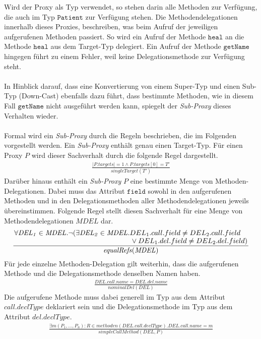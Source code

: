 \documentclass[a4paper,12pt]{article}
\begin{document}
Wird der Proxy als Typ verwendet, so stehen darin alle Methoden zur Verfügung, die auch im Typ $\texttt{Patient}$ zur Verfügung stehen. Die Methodendelegationen innerhalb dieses Proxies, beschreiben, was beim Aufruf der jeweiligen aufgerufenen Methoden passiert. So wird ein Aufruf der Methode $\texttt{heal}$ an die Methode $\texttt{heal}$ aus dem Target-Typ delegiert. Ein Aufruf der Methode $\texttt{getName}$ hingegen führt zu einem Fehler, weil keine Delegationsmethode zur Verfügung steht.\\\\
In Hinblick darauf, dass eine Konvertierung von einem Super-Typ und einen Sub-Typ (Down-Cast) ebenfalls dazu führt, dass bestimmte Methoden, wie in diesem Fall $\texttt{getName}$ nicht ausgeführt werden kann, spiegelt der \emph{Sub-Proxy} dieses Verhalten wieder.\\\\
Formal wird ein \emph{Sub-Proxy} durch die Regeln beschrieben, die im Folgenden vorgestellt werden.
Ein \emph{Sub-Proxy} enthält genau einen Target-Typ. Für einen Proxy $P$ wird dieser Sachverhalt durch die folgende Regel dargestellt.
\begin{gather*}
\frac{|P.targets| = 1 \wedge P.targets[0] = T'}{\mathit{singleTarget(T')}}
\end{gather*}
Darüber hinaus enthält ein \emph{Sub-Proxy} $P$ eine bestimmte Menge von Methoden-Delegationen. Dabei muss das Attribut $\texttt{field}$ sowohl in den aufgerufenen Methoden und in den Delegationsmethoden aller Methodendelegationen jeweils übereinstimmen. Folgende Regel stellt diesen Sachverhalt für eine Menge von Methodendelegationen $\mathit{MDEL}$ dar.
\begin{gather*}
\frac{\splitfrac{\forall \mathit{DEL_1}\in \mathit{MDEL}. \neg(\exists \mathit{DEL_2} \in \mathit{MDEL}.DEL_1.call.field \neq DEL_2.call.field}{ \vee DEL_1.del.field \neq DEL_2.del.field )}}
{\mathit{equalRefs(MDEL)}}
\end{gather*}
Für jede einzelne Methoden-Delegation gilt weiterhin, dass die aufgerufenen Methode und die Delegationsmethode denselben Namen haben.
\begin{gather*}
\frac{\mathit{DEL.call.name} = \mathit{DEL.del.name}}
{\mathit{nominalDel(DEL)}}
\end{gather*}
Die aufgerufene Methode muss dabei generell im Typ aus dem Attribut $call.declType$ deklariert sein und die Delegationsmethode im Typ aus dem Attribut $del.declType$.
\begin{gather*}
\frac{\exists m(P_1,...,P_n):R \in \mathit{methoden(DEL.call.declType)}. \mathit{DEL.call.name} = m}
{\mathit{simpleCallMethod(DEL, P)}}
\end{gather*}
\end{document}
